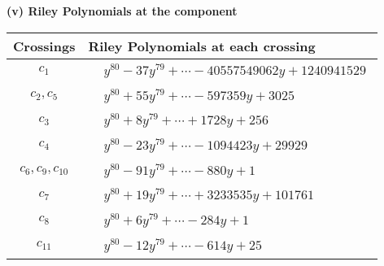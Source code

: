 \documentclass[1p]{elsarticle_modified}
\theoremstyle{definition}
\begin{document}
\newpage\renewcommand{\arraystretch}{1}
\flushleft \textbf{(v) Riley Polynomials at the component}\newline \\
\begin{tabular}{m{50pt}|m{274pt}}
Crossings & \hspace{64pt}Riley Polynomials at each crossing \\
\hline $$\begin{aligned}c_{1}\end{aligned}$$&$\begin{aligned}
&y^{80}-37 y^{79}+\cdots-40557549062 y+1240941529
\end{aligned}$\\
\hline $$\begin{aligned}c_{2},c_{5}\end{aligned}$$&$\begin{aligned}
&y^{80}+55 y^{79}+\cdots-597359 y+3025
\end{aligned}$\\
\hline $$\begin{aligned}c_{3}\end{aligned}$$&$\begin{aligned}
&y^{80}+8 y^{79}+\cdots+1728 y+256
\end{aligned}$\\
\hline $$\begin{aligned}c_{4}\end{aligned}$$&$\begin{aligned}
&y^{80}-23 y^{79}+\cdots-1094423 y+29929
\end{aligned}$\\
\hline $$\begin{aligned}c_{6},c_{9},c_{10}\end{aligned}$$&$\begin{aligned}
&y^{80}-91 y^{79}+\cdots-880 y+1
\end{aligned}$\\
\hline $$\begin{aligned}c_{7}\end{aligned}$$&$\begin{aligned}
&y^{80}+19 y^{79}+\cdots+3233535 y+101761
\end{aligned}$\\
\hline $$\begin{aligned}c_{8}\end{aligned}$$&$\begin{aligned}
&y^{80}+6 y^{79}+\cdots-284 y+1
\end{aligned}$\\
\hline $$\begin{aligned}c_{11}\end{aligned}$$&$\begin{aligned}
&y^{80}-12 y^{79}+\cdots-614 y+25
\end{aligned}$\\
\hline
\end{tabular}\\~\\
\end{document}
